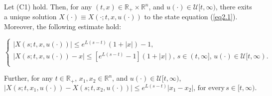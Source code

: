 \begin{prop}\label{prop2.1.1}
	Let (C1) hold. Then, for any $(t,x)\in\mathbb{R}_{+}\times\mathbb{R}^n$, and $u(\cdot)\in \mathcal{U}[t,\infty)$, there exits a unique solution $X(\cdot)\equiv X(\cdot;t,x,u(\cdot))$ to the state equation (\ref{eq2.1}). Moreover, the following estimate hold:
	
	\begin{equation}\label{eq2.2}
	\left\{ \begin{array}{l}
	|X(s;t,x,u(\cdot))|\leq e^{L(s-t)}(1+|x|)-1, \\
	|X(s;t,x,u(\cdot))-x|\leq [e^{L(s-t)}-1](1+|x|),\, s\in (t,\infty],\, u(\cdot)\in \mathcal{U}[t,\infty).\\
	\end{array}
	\right.
	\end{equation} 
	
	Further, for any $t\in \mathbb{R}_{+}$, $x_1,x_2\in \mathbb{R}^n$, and $u(\cdot)\in \mathcal{U}[t,\infty)$,
	\begin{equation}\label{eq2.3}
	|X(s;t,x_1,u(\cdot))-X(s;t,x_2,u(\cdot))|\leq e^{L(s-t)}|x_1-x_2|,\,\mbox{for every}\, s\in [t,\infty).
	\end{equation}
\end{prop}

